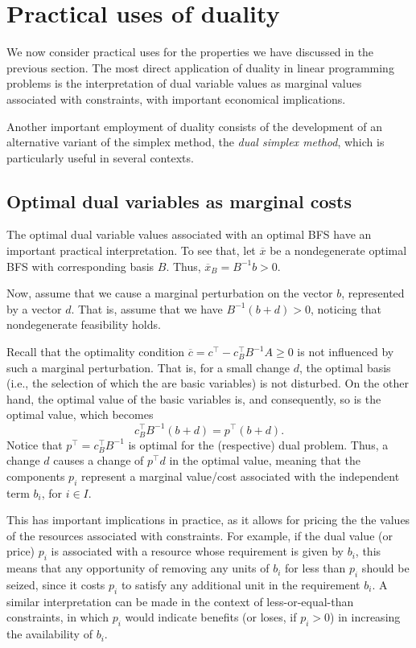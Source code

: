 \section{Practical uses of duality}

We now consider practical uses for the properties we have discussed in the previous section. The most direct application of duality in linear programming problems is the interpretation of dual variable values as marginal values associated with constraints, with important economical implications. 

Another important employment of duality consists of the development of an alternative variant of the simplex method, the \emph{dual simplex method}, which is particularly useful in several contexts.



\subsection{Optimal dual variables as marginal costs}

The optimal dual variable values associated with an optimal BFS have an important practical interpretation. To see that, let $\overline{x}$ be a nondegenerate optimal BFS with corresponding basis $B$. Thus, $\overline{x}_B = B^{-1}b > 0$.

Now, assume that we cause a marginal perturbation on the vector $b$, represented by a vector $d$. That is, assume that we have $B^{-1}(b + d) > 0$, noticing that nondegenerate feasibility holds.

Recall that the optimality condition $\overline{c} = c^\top - c_B ^\top B^{-1}A \geq 0$ is not influenced by such a marginal perturbation. That is, for a small change $d$, the optimal basis (i.e., the selection of which the are basic variables) is not disturbed. On the other hand, the optimal value of the basic variables is, and consequently, so is the optimal value, which becomes
%
\begin{equation*}
	c_B^\top B^{-1}(b + d) = p^\top(b + d). 
\end{equation*}
%
Notice that $p^\top = c_B^\top B^{-1}$ is optimal for the (respective) dual problem. Thus, a change $d$ causes a change of $p^\top d$ in the optimal value, meaning that the components $p_i$ represent a marginal value/cost associated with the independent term $b_i$, for $i \in I$. 

This has important implications in practice, as it allows for pricing the the values of the resources associated with constraints. For example, if the dual value (or price) $p_i$ is associated with a resource whose requirement is given by $b_i$, this means that any opportunity of removing any units of $b_i$ for less than $p_i$ should be seized, since it costs $p_i$ to satisfy any additional unit in the requirement $b_i$. A similar interpretation can be made in the context of less-or-equal-than constraints, in which $p_i$ would indicate benefits (or loses, if $p_i > 0$) in increasing the availability of $b_i$. 

